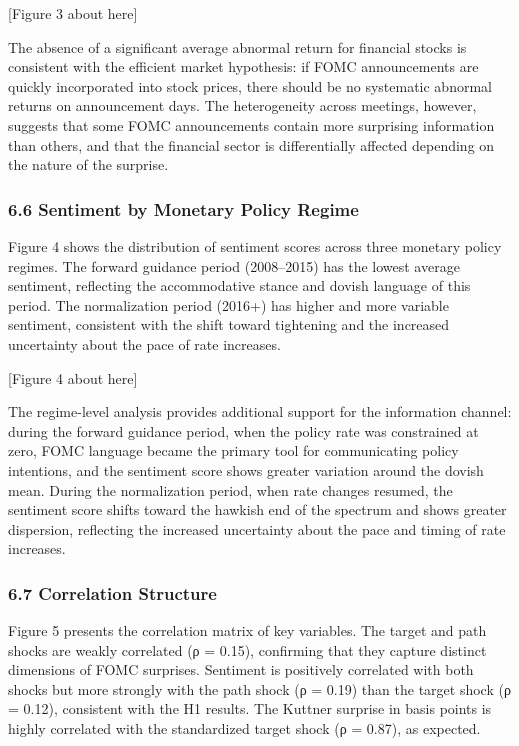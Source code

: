 \documentclass[
]{article}
\begin{document}
{[}Figure 3 about here{]}

The absence of a significant average abnormal return for financial
stocks is consistent with the efficient market hypothesis: if FOMC
announcements are quickly incorporated into stock prices, there should
be no systematic abnormal returns on announcement days. The
heterogeneity across meetings, however, suggests that some FOMC
announcements contain more surprising information than others, and that
the financial sector is differentially affected depending on the nature
of the surprise.

\subsubsection{6.6 Sentiment by Monetary Policy
Regime}\label{sentiment-by-monetary-policy-regime}

Figure 4 shows the distribution of sentiment scores across three
monetary policy regimes. The forward guidance period (2008--2015) has
the lowest average sentiment, reflecting the accommodative stance and
dovish language of this period. The normalization period (2016+) has
higher and more variable sentiment, consistent with the shift toward
tightening and the increased uncertainty about the pace of rate
increases.

{[}Figure 4 about here{]}

The regime-level analysis provides additional support for the
information channel: during the forward guidance period, when the policy
rate was constrained at zero, FOMC language became the primary tool for
communicating policy intentions, and the sentiment score shows greater
variation around the dovish mean. During the normalization period, when
rate changes resumed, the sentiment score shifts toward the hawkish end
of the spectrum and shows greater dispersion, reflecting the increased
uncertainty about the pace and timing of rate increases.

\subsubsection{6.7 Correlation Structure}\label{correlation-structure}

Figure 5 presents the correlation matrix of key variables. The target
and path shocks are weakly correlated (ρ = 0.15), confirming that they
capture distinct dimensions of FOMC surprises. Sentiment is positively
correlated with both shocks but more strongly with the path shock (ρ =
0.19) than the target shock (ρ = 0.12), consistent with the H1 results.
The Kuttner surprise in basis points is highly correlated with the
standardized target shock (ρ = 0.87), as expected.
\end{document}
